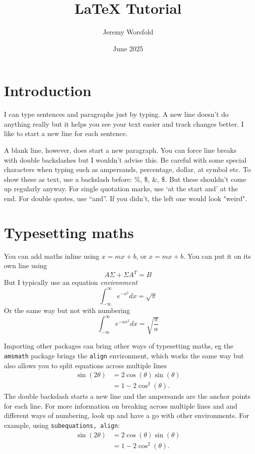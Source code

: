 \documentclass[11pt, a4paper, twocolumn]{article}
\title{LaTeX Tutorial}
\author{Jeremy Worsfold}
\date{June 2025}
\begin{document}
\maketitle

\section{Introduction}

I can type sentences and paragraphs just by typing.
A new line doesn't do anything really but it helps you see your text easier and track changes better.
I like to start a new line for each sentence.

A blank line, however, does start a new paragraph. You can force line breaks with double backslashes but I wouldn't advise this. 
Be careful with some special characters when typing such as ampersands, percentage, dollar, at symbol etc. To show these as text, use a backslash before: \%, \$, \&, \$. But these shouldn't come up regularly anyway.
For single quotation marks, use `at the start and' at the end. For double quotes, use ``and''. 
If you didn't, the left one would look "weird".


\section{Typesetting maths}

You can add maths inline using $x=mx + b$, or \(x=mx+b\). You can put it on its own line using 
\[
    A\Sigma + \Sigma A^T = B
\]
But I typically use an equation \textit{environment}
\begin{equation}
    \int_{-\infty}^\infty e^{-x^2} d x = \sqrt{\pi}
\end{equation}
Or the same way but not with numbering
\begin{equation*}
    \int_{-\infty}^\infty e^{-ax^2} d x = \sqrt{\frac{\pi}{a}}
\end{equation*}

Importing other packages can bring other ways of typesetting maths, eg the \texttt{amsmath} package brings the \texttt{align} environment, which works the same way but also allows you to split equations across multiple lines
\begin{align}
    \sin(2\theta) & = 2\cos(\theta)\sin(\theta) \\
    & = 1-2\cos^2(\theta).
\end{align}
The double backslash starts a new line and the ampersands are the anchor points for each line.
For more information on breaking across multiple lines and and different ways of numbering, look up and have a go with other environments.
For example, using \texttt{subequations, align}:
\begin{subequations} %
\begin{align} %
    \sin(2\theta) & = 2\cos(\theta)\sin(\theta) \\
    & = 1-2\cos^2(\theta).
\end{align}
\end{subequations}
\end{document}
